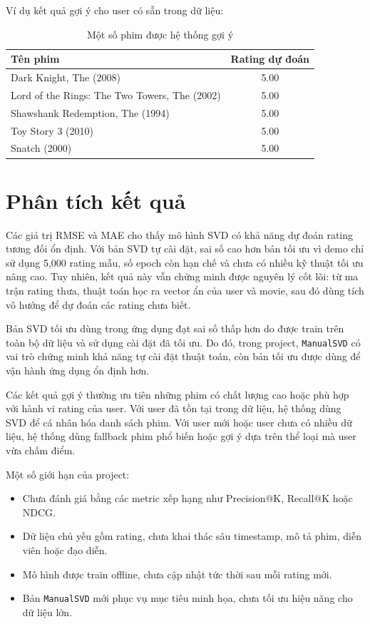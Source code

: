 \documentclass[12pt,a4paper]{article}
\begin{document}
Ví dụ kết quả gợi ý cho user có sẵn trong dữ liệu:

\begin{table}[H]
    \centering
    \begin{tabular}{p{9cm}c}
        \toprule
        \textbf{Tên phim} & \textbf{Rating dự đoán} \\
        \midrule
        Dark Knight, The (2008) & 5.00 \\
        Lord of the Rings: The Two Towers, The (2002) & 5.00 \\
        Shawshank Redemption, The (1994) & 5.00 \\
        Toy Story 3 (2010) & 5.00 \\
        Snatch (2000) & 5.00 \\
        \bottomrule
    \end{tabular}
    \caption{Một số phim được hệ thống gợi ý}
\end{table}

\section{Phân tích kết quả}

Các giá trị RMSE và MAE cho thấy mô hình SVD có khả năng dự đoán rating tương đối ổn định. Với bản SVD tự cài đặt, sai số cao hơn bản tối ưu vì demo chỉ sử dụng 5,000 rating mẫu, số epoch còn hạn chế và chưa có nhiều kỹ thuật tối ưu nâng cao. Tuy nhiên, kết quả này vẫn chứng minh được nguyên lý cốt lõi: từ ma trận rating thưa, thuật toán học ra vector ẩn của user và movie, sau đó dùng tích vô hướng để dự đoán các rating chưa biết.

Bản SVD tối ưu dùng trong ứng dụng đạt sai số thấp hơn do được train trên toàn bộ dữ liệu và sử dụng cài đặt đã tối ưu. Do đó, trong project, \texttt{ManualSVD} có vai trò chứng minh khả năng tự cài đặt thuật toán, còn bản tối ưu được dùng để vận hành ứng dụng ổn định hơn.

Các kết quả gợi ý thường ưu tiên những phim có chất lượng cao hoặc phù hợp với hành vi rating của user. Với user đã tồn tại trong dữ liệu, hệ thống dùng SVD để cá nhân hóa danh sách phim. Với user mới hoặc user chưa có nhiều dữ liệu, hệ thống dùng fallback phim phổ biến hoặc gợi ý dựa trên thể loại mà user vừa chấm điểm.

Một số giới hạn của project:

\begin{itemize}
    \item Chưa đánh giá bằng các metric xếp hạng như Precision@K, Recall@K hoặc NDCG.
    \item Dữ liệu chủ yếu gồm rating, chưa khai thác sâu timestamp, mô tả phim, diễn viên hoặc đạo diễn.
    \item Mô hình được train offline, chưa cập nhật tức thời sau mỗi rating mới.
    \item Bản \texttt{ManualSVD} mới phục vụ mục tiêu minh họa, chưa tối ưu hiệu năng cho dữ liệu lớn.
\end{itemize}
\end{document}
